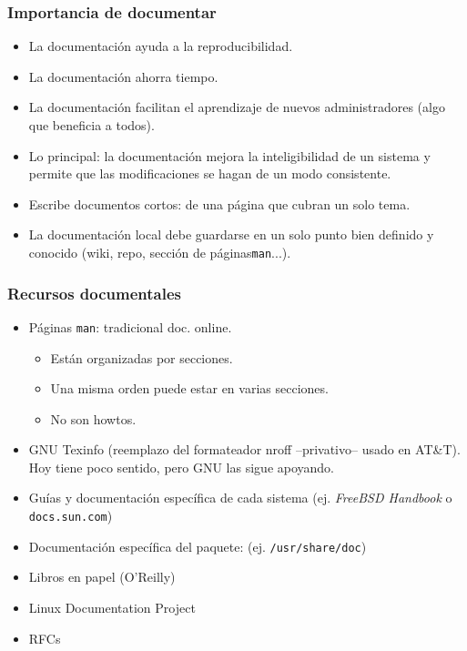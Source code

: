 \documentclass{beamer}
\begin{document}
\begin{frame}
\frametitle{Importancia de documentar}

\begin{itemize}
\item La documentación ayuda a la reproducibilidad. 
\item La documentación ahorra tiempo. 
\item La documentación facilitan el aprendizaje de nuevos administradores (algo que beneficia a todos). 
\item Lo principal: la documentación mejora la inteligibilidad de un sistema y permite que
	las modificaciones se hagan de un modo consistente.
\item Escribe documentos cortos: de una página que cubran un solo tema.
\item La documentación local debe guardarse en un solo punto bien definido y conocido (wiki, repo, sección de páginas\texttt{man}...).
\end{itemize}

\end{frame}



\begin{frame}
\frametitle{Recursos documentales}

\begin{itemize}
\item Páginas \texttt{man}: tradicional doc. online.
	\begin{itemize}
	\item Están organizadas por secciones. 
	\item Una misma orden puede estar en varias secciones.
	\item No son howtos. 
	\end{itemize}
\item GNU Texinfo (reemplazo del formateador nroff --privativo-- usado en AT\&T). Hoy tiene poco sentido, pero GNU las sigue apoyando. 
\item Guías y documentación específica de cada sistema (ej. \textit{FreeBSD Handbook} o \texttt{docs.sun.com})
\item Documentación específica del paquete: (ej. \texttt{/usr/share/doc})
\item Libros en papel (O'Reilly)
\item Linux Documentation Project
\item RFCs
\end{itemize}

\end{frame}
\end{document}
